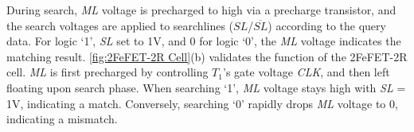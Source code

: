 


During search, \textit{ML} voltage is precharged to high via a precharge transistor, and the search voltages are applied to searchlines ($\textit{SL}$/$\overline{\textit{SL}}$) according to the query data. For logic `1', \textit{SL} set to 1V, and 0 for logic `0', the  \textit{ML} voltage indicates the matching result. 
\autoref{fig:2FeFET-2R Cell}(b) validates the function of the 2FeFET-2R cell. 
\textit{ML} is first precharged by controlling $\textit{T}_\text{1}$'s gate voltage \textit{CLK}, and then left floating upon  search phase. 
When searching `1', \textit{ML} voltage stays high with  \textit{SL} = 1V, indicating a match. Conversely, searching `0' rapidly drops \textit{ML} voltage to 0, indicating a mismatch. %


